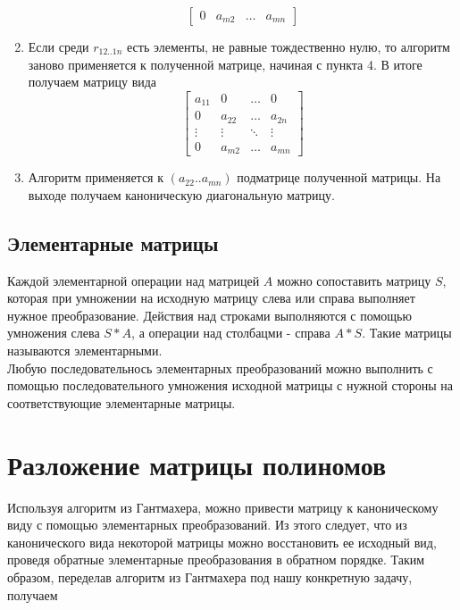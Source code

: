 \documentclass[12pt]{extreport}
\begin{document}
\begin{enumerate}
\[\begin{bmatrix}
				0 & a_{m2} & \dots & a_{mn}
			\end{bmatrix} 
			\]
			\item Если среди $r_{12..1n}$ есть элементы, не равные тождественно
			нулю, то алгоритм заново применяется к полученной матрице, начиная
			с пункта 4. В итоге получаем матрицу вида
			\[ 
			\begin{bmatrix}
				a_{11} & 0 & \dots & 0 \\
				0 & a_{22} & \dots & a_{2n} \\
				\vdots & \vdots & \ddots & \vdots \\
				0 & a_{m2} & \dots & a_{mn}
			\end{bmatrix} 
			\]
			\item Алгоритм применяется к $(a_{22}..a_{mn})$ подматрице полученной матрицы.
			На выходе получаем каноническую диагональную матрицу.
		\end{enumerate}
		\newpage
		\section{Элементарные матрицы}
			Каждой элементарной операции над матрицей $A$ можно сопоставить матрицу $S$,
			которая при умножении на исходную матрицу слева или справа выполняет нужное
			преобразование. Действия над строками выполняются с помощью умножения слева
			$S*A$, а операции над столбацми - справа $A*S$. Такие матрицы называются
			элементарными. \\ Любую последовательнось элементарных преобразований можно
			выполнить с помощью последовательного умножения исходной матрицы с нужной
			стороны на соответствующие элементарные матрицы.
	\chapter{Разложение матрицы полиномов}
		Используя алгоритм из Гантмахера, можно привести матрицу к каноническому виду с
		помощью элементарных преобразований. Из этого следует, что из канонического
		вида некоторой матрицы можно восстановить ее исходный вид, проведя обратные
		элементарные преобразования в обратном порядке. Таким образом, переделав
		алгоритм из Гантмахера под нашу конкретную задачу, получаем
\end{document}
